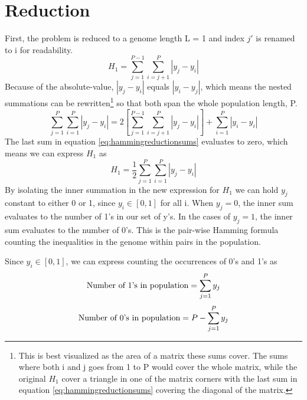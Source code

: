 \section{Reduction}
First, the problem is reduced to a genome length L = 1 and index \({j}'\) is renamed to i for readability.
\begin{equation*}
    H_{1}=\sum_{j=1}^{P-1}\sum_{i=j+1}^{P}\left |y_{j}-y_{i}\right |
\end{equation*}
Because of the absolute-value, \(\left |y_{j}-y_{i}\right |\) equals \(\left |y_{i}-y_{j}\right |\), which means the nested summations can be rewritten\footnote{This is best visualized as the area of a matrix these sums cover. The sums where both i and j goes from 1 to P would cover the whole matrix, while the original \(H_{1}\) cover a triangle in one of the matrix corners with the last sum in equation \ref{eq:hammingreductionsums} covering the diagonal of the matrix.} so that both span the whole population length, P.
\begin{equation}
    \label{eq:hammingreductionsums}
    \sum_{j=1}^{P}\sum_{i=1}^{P}\left | y_{j}-y_{i} \right | = 2\left [ \sum_{j=1}^{P-1}\sum_{i=j+1}^{P}\left | y_{j}-y_{i} \right | \right ]+ \sum_{i=1}^{P}\left | y_{i}-y_{i} \right | 
\end{equation}
The last sum in equation \ref{eq:hammingreductionsums} evaluates to zero, which means we can express \(H_{1}\) as 
\begin{equation*}
    H_{1} = \frac{1}{2}\sum_{j=1}^{P}\sum_{i=1}^{P}\left | y_{j}-y_{i} \right |
\end{equation*}
By isolating the inner summation in the new expression for \(H_{1}\) we can hold \(y_{j}\) constant to either 0 or 1, since \(y_{i}\in\left [0, 1\right]\) for all i. When \(y_{j}=0\), the inner sum evaluates to the number of 1's in our set of y's. In the cases of \(y_{j}=1\), the inner sum evaluates to the number of 0's. This is the pair-wise Hamming formula counting the inequalities in the genome within pairs in the population.

Since \(y_{i}\in\left [0, 1\right]\), we can express counting the occurrences of 0's and 1's as
\begin{equation*}
    \textnormal{Number of 1's in population} = \sum_{j=1}^{P}y_{j} 
\end{equation*}
\begin{equation*}
    \textnormal{Number of 0's in population} = P-\sum_{j=1}^{P}y_{j}
\end{equation*}

